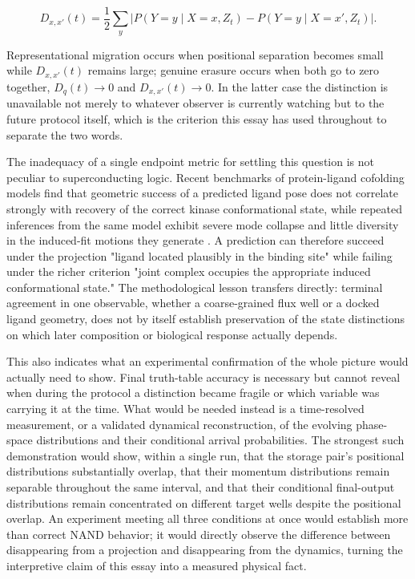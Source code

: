 \documentclass[11pt]{article}
\begin{document}
\[
D_{x,x'}(t) = \frac12\sum_y \bigl|P(Y=y\mid X=x,Z_t) - P(Y=y\mid X=x',Z_t)\bigr|.
\]

Representational migration occurs when positional separation becomes small while $D_{x,x'}(t)$ remains large; genuine erasure occurs when both go to zero together, $D_q(t)\to0$ and $D_{x,x'}(t)\to0$. In the latter case the distinction is unavailable not merely to whatever observer is currently watching but to the future protocol itself, which is the criterion this essay has used throughout to separate the two words.

The inadequacy of a single endpoint metric for settling this question is not peculiar to superconducting logic. Recent benchmarks of protein-ligand cofolding models find that geometric success of a predicted ligand pose does not correlate strongly with recovery of the correct kinase conformational state, while repeated inferences from the same model exhibit severe mode collapse and little diversity in the induced-fit motions they generate \cite{SunHeadGordon2026}. A prediction can therefore succeed under the projection "ligand located plausibly in the binding site" while failing under the richer criterion "joint complex occupies the appropriate induced conformational state." The methodological lesson transfers directly: terminal agreement in one observable, whether a coarse-grained flux well or a docked ligand geometry, does not by itself establish preservation of the state distinctions on which later composition or biological response actually depends.

This also indicates what an experimental confirmation of the whole picture would actually need to show. Final truth-table accuracy is necessary but cannot reveal when during the protocol a distinction became fragile or which variable was carrying it at the time. What would be needed instead is a time-resolved measurement, or a validated dynamical reconstruction, of the evolving phase-space distributions and their conditional arrival probabilities. The strongest such demonstration would show, within a single run, that the storage pair's positional distributions substantially overlap, that their momentum distributions remain separable throughout the same interval, and that their conditional final-output distributions remain concentrated on different target wells despite the positional overlap. An experiment meeting all three conditions at once would establish more than correct NAND behavior; it would directly observe the difference between disappearing from a projection and disappearing from the dynamics, turning the interpretive claim of this essay into a measured physical fact.
\end{document}
